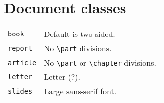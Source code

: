 \section{Document classes}
\begin{tabular}{@{}ll@{}}
\verb!book!    & Default is two-sided. \\
\verb!report!  & No \verb!\part! divisions. \\
\verb!article! & No \verb!\part! or \verb!\chapter! divisions. \\
\verb!letter!  & Letter (?). \\
\verb!slides!  & Large sans-serif font.
\end{tabular}